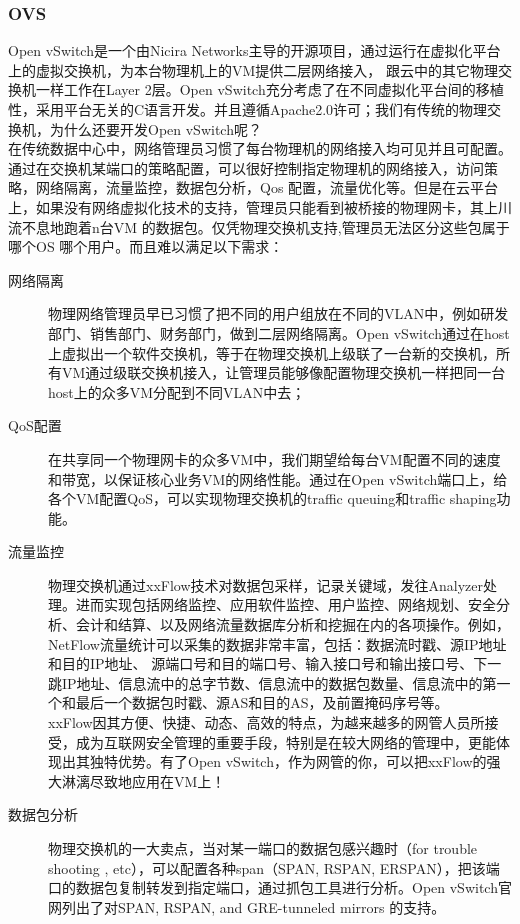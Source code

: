 \documentclass[a4paper, 11pt]{article}                                                   %
\begin{document}
\begin{CJK*}{UTF8}{song}
\subsubsection{OVS}
Open vSwitch是一个由Nicira Networks主导的开源项目，通过运行在虚拟化平台上的虚拟交换机，为本台物理机上的VM提供二层网络接入， 跟云中的其它物理交换机一样工作在Layer 2层。Open vSwitch充分考虑了在不同虚拟化平台间的移植性，采用平台无关的C语言开发。并且遵循Apache2.0许可；我们有传统的物理交换机，为什么还要开发Open vSwitch呢？\\
在传统数据中心中，网络管理员习惯了每台物理机的网络接入均可见并且可配置。通过在交换机某端口的策略配置，可以很好控制指定物理机的网络接入，访问策略，网络隔离，流量监控，数据包分析，Qos 配置，流量优化等。但是在云平台上，如果没有网络虚拟化技术的支持，管理员只能看到被桥接的物理网卡，其上川流不息地跑着n台VM 的数据包。仅凭物理交换机支持,管理员无法区分这些包属于哪个OS 哪个用户。而且难以满足以下需求：
\begin{description}
  \item[网络隔离] 物理网络管理员早已习惯了把不同的用户组放在不同的VLAN中，例如研发部门、销售部门、财务部门，做到二层网络隔离。Open vSwitch通过在host上虚拟出一个软件交换机，等于在物理交换机上级联了一台新的交换机，所有VM通过级联交换机接入，让管理员能够像配置物理交换机一样把同一台host上的众多VM分配到不同VLAN中去；
  \item[QoS配置] 在共享同一个物理网卡的众多VM中，我们期望给每台VM配置不同的速度和带宽，以保证核心业务VM的网络性能。通过在Open vSwitch端口上，给各个VM配置QoS，可以实现物理交换机的traffic queuing和traffic shaping功能。
  \item[流量监控] 物理交换机通过xxFlow技术对数据包采样，记录关键域，发往Analyzer处理。进而实现包括网络监控、应用软件监控、用户监控、网络规划、安全分析、会计和结算、以及网络流量数据库分析和挖掘在内的各项操作。例如，NetFlow流量统计可以采集的数据非常丰富，包括：数据流时戳、源IP地址和目的IP地址、 源端口号和目的端口号、输入接口号和输出接口号、下一跳IP地址、信息流中的总字节数、信息流中的数据包数量、信息流中的第一个和最后一个数据包时戳、源AS和目的AS，及前置掩码序号等。\\
      xxFlow因其方便、快捷、动态、高效的特点，为越来越多的网管人员所接受，成为互联网安全管理的重要手段，特别是在较大网络的管理中，更能体现出其独特优势。有了Open vSwitch，作为网管的你，可以把xxFlow的强大淋漓尽致地应用在VM上！
  \item[数据包分析] 物理交换机的一大卖点，当对某一端口的数据包感兴趣时（for trouble shooting , etc），可以配置各种span（SPAN, RSPAN, ERSPAN），把该端口的数据包复制转发到指定端口，通过抓包工具进行分析。Open vSwitch官网列出了对SPAN, RSPAN, and GRE-tunneled mirrors 的支持。

\end{description}
\end{CJK*}
\end{document}
